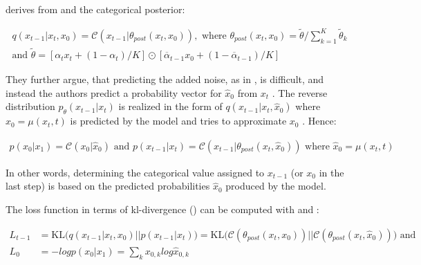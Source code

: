 \textcite{hoogeboom2021ArgmaxFlowsMultinomial} derives from  and  the categorical posterior:

\begin{equation}
  \begin{gathered}
  \label{eqn:mul_diff3}
  q(x_{t-1}|x_t, x_{0}) = \mathcal{C}(x_{t-1}|\theta_{post}(x_t,x_0)),\textrm{ where } \theta_{post}(x_t,x_0)=\tilde{\theta}/\sum_{k=1}^{K}\tilde{\theta}_k \\
  \textrm{and } \tilde{\theta} = \left[\alpha_tx_{t}+(1-\alpha_t)/K \right] \odot \left[\overline{\alpha}_{t-1}x_{0}+(1-\overline{\alpha}_{t-1})/K \right]
  \end{gathered}
\end{equation}

They further argue, that predicting the added noise, as in \cite{ho2020DenoisingDiffusionProbabilistic},
is difficult, and instead the authors predict a probability vector for $\hat{x}_0$ from $x_t$ \cite{hoogeboom2021ArgmaxFlowsMultinomial}.
The reverse distribution $p_\theta(x_{t-1}|x_t)$ is realized in the form of $q(x_{t-1}|x_t,\hat{x}_0)$ where $\hat{x}_0=\mu(x_t, t)$ is predicted by the \gls{model} and tries to approximate $x_0$ \cite{hoogeboom2021ArgmaxFlowsMultinomial}.
Hence:

\begin{equation}
  \begin{align*}
    \label{eqn:mul_diff4}
    p(x_0|x_1) = \mathcal{C}(x_0|\hat{x}_0) \textrm{ and } p(x_{t-1}|x_t) =  \mathcal{C}(x_{t-1}|\theta_{post}(x_t, \hat{x}_0)) \textrm{ where } \hat{x}_0=\mu(x_t,t)
  \end{align*}
\end{equation}

In other words, determining the categorical value assigned to $x_{t-1}$ (or $x_0$ in the last step) is based on the predicted probabilities $\hat{x}_0$ produced by the \gls{model}.


The loss function in terms of \gls{kl}-divergence () can be computed with  and :

\begin{equation}
  \begin{align*}
    \label{eqn:mul_diff5}
    L_{t-1}&=\text{KL}\Big(q(x_{t-1}|x_t, x_0)\big\vert\big\vert p(x_{t-1}|x_t)\Big) = \text{KL}\Big(\mathcal{C}(\theta_{post}(x_t, x_0))\big\vert\big\vert \mathcal{C}(\theta_{post}(x_t, \hat{x}_0))\Big) \textrm{ and}\\
    L_{0} &= -logp(x_0|x_1) = \sum_{k}^{}x_{0,k}log\hat{x}_{0,k}
  \end{align*}
\end{equation}

